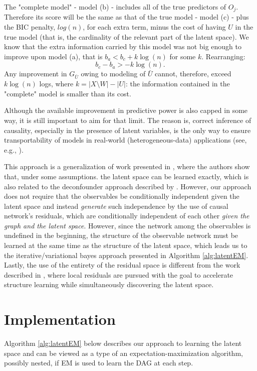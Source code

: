 \documentclass{article}
\begin{document}
The "complete model" - model (b) - includes all of the true predictors of $O_j$.  Therefore its score will be the same as that of the true model - model (c) - plus the BIC penalty, $log(n)$, for each extra term, minus the cost of having $U$ in the true model (that is, the cardinality of the relevant part of the latent space).  We know that the extra information carried by this model was not big enough to improve upon model (a), that is $b_a < b_c + k \log(n)$ for some $k$.  Rearranging:
\begin{equation}
    b_c - b_a > -k\log(n).
    \label{eq:ceilingTheorem}
\end{equation}
Any improvement in $G_{\bar{U}}$ owing to modeling of $\bar{U}$ cannot, therefore, exceed $k\log(n)$ logs, where $k = |X \setminus W| - |U|$: the information contained in the "complete" model is smaller than its cost.

Although the available improvement in predictive power is also capped in some way, it is still important to aim for that limit.  The reason is, correct inference of causality, especially in the presence of latent variables, is the only way to ensure transportability of models in real-world (heterogeneous-data) applications (see, e.g., \cite{bareinboim_causal_2016}).

This approach is a generalization of work presented in \cite{anandkumar_learning_2013}, where the authors show that, under some assumptions. the latent space can be learned exactly, which is also related to the deconfounder approach described by \cite{wang_deconfounder_2019}.  However, our approach does not require that the observables be conditionally independent given the latent space and instead \textit{generate} such independence by the use of causal network's residuals, which are conditionally independent of each other \textit{given the graph and the latent space}.  However, since the network among the observables is undefined in the beginning, the structure of the observable network must be learned at the same time as the structure of the latent space, which leads us to the iterative/variational bayes approach presented in Algorithm \ref{alg:latentEM}.  Lastly, the use of the entirety of the residual space is different from the work described in \cite{elidan_ideal_2007}, where local residuals are pursued with the goal to accelerate structure learning while simultaneously discovering the latent space.

\section{Implementation}
Algorithm \ref{alg:latentEM} below describes our approach to learning the latent space and can be viewed as a type of an expectation-maximization algorithm, possibly nested, if EM is used to learn the DAG at each step.
\end{document}
